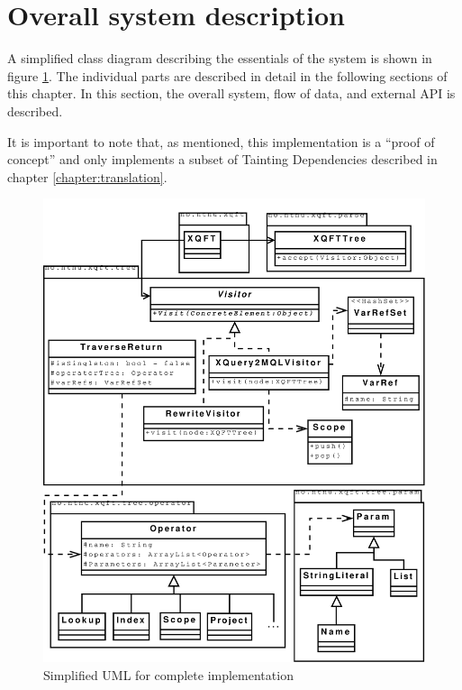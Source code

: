 \section{Overall system description}
A simplified class diagram describing the essentials of the system is shown in
figure \ref{fig:impl:sys:uml_complete}. The individual parts are described in
detail in the following sections of this chapter. In this section, the overall
system, flow of data, and external API is described.

It is important to note that, as mentioned, this implementation is a ``proof of
concept'' and only implements a subset of Tainting Dependencies described in chapter
\ref{chapter:translation}.

\begin{figure}[!htp]
\begin{center}
\includegraphics[scale=0.40]{diagrams/complete_uml}
  \caption{Simplified UML for complete implementation}
  \label{fig:impl:sys:uml_complete}
\end{center}
\end{figure}

